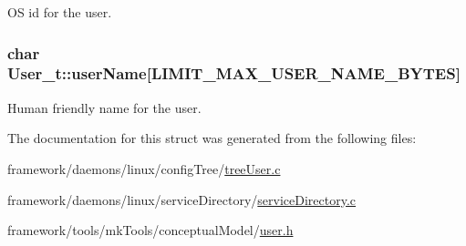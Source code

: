 OS id for the user. 

\subsubsection[{\texorpdfstring{user\+Name}{userName}}]{\setlength{\rightskip}{0pt plus 5cm}char User\+\_\+t\+::user\+Name\mbox{[}{\bf L\+I\+M\+I\+T\+\_\+\+M\+A\+X\+\_\+\+U\+S\+E\+R\+\_\+\+N\+A\+M\+E\+\_\+\+B\+Y\+T\+ES}\mbox{]}}\hypertarget{struct_user__t_a979a46d6eb674114d1ac1b890d71b0fc}{}\label{struct_user__t_a979a46d6eb674114d1ac1b890d71b0fc}


Human friendly name for the user. 



The documentation for this struct was generated from the following files\+:\begin{DoxyCompactItemize}
\item 
framework/daemons/linux/config\+Tree/\hyperlink{tree_user_8c}{tree\+User.\+c}\item 
framework/daemons/linux/service\+Directory/\hyperlink{service_directory_8c}{service\+Directory.\+c}\item 
framework/tools/mk\+Tools/conceptual\+Model/\hyperlink{tools_2mk_tools_2conceptual_model_2user_8h}{user.\+h}\end{DoxyCompactItemize}
